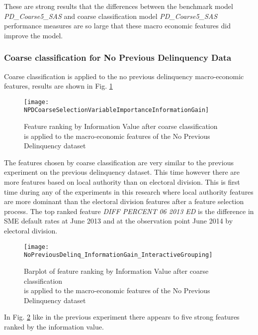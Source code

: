These are strong results that the differences between the benchmark model \textit{PD\_Coarse5\_SAS} and coarse classification model \textit{PD\_Coarse5\_SAS} performance measures are so large that these macro economic features did improve the model.


\subsubsection{Coarse classification for No Previous Delinquency Data}

Coarse classification is applied to the no previous delinquency macro-economic features, results are shown in Fig. \ref{fig:NPDCoarseSelectionVariableImportanceInformationGain}

\begin{figure}[H]
	\texttt{[image: NPDCoarseSelectionVariableImportanceInformationGain]}
	\caption{Feature ranking by Information Value after coarse classification \\is applied to the macro-economic features of the No Previous Delinquency dataset}
	\label{fig:NPDCoarseSelectionVariableImportanceInformationGain}
\end{figure}


The features chosen by coarse classification are very similar to the previous experiment on the previous delinquency dataset. This time however there are more features based on local authority than on electoral division. This is first time during any of the experiments in this research where local authority features are more dominant than the electoral division features after a feature selection process. The top ranked feature \textit{DIFF PERCENT 06 2013 ED} is the difference in SME default rates at June 2013 and at the observation point June 2014 by electoral division. 

\begin{figure}[H]
	\texttt{[image: NoPreviousDelinq\_InformationGain\_InteractiveGrouping]}
	\caption{Barplot of feature ranking by Information Value after coarse classification \\is applied to the macro-economic features of the No Previous Delinquency dataset}
	\label{fig:Information Value using SAS No Previous Delinquency Features}
\end{figure}

In Fig. \ref{fig:Information Value using SAS No Previous Delinquency Features} like in the previous experiment there appears to five strong features ranked by the information value. 

